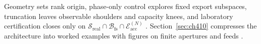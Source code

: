 
Geometry sets rank origin, phase-only control explores fixed export subspaces, truncation leaves observable shoulders and capacity knees, and laboratory
certification closes only on \(\mathcal{S}_{\mathrm{real}}\cap\mathcal{B}_{\mathrm{fs}}\cap\mathcal{E}_{\mathrm{acc}}^{(N)}\) \cite{stratton1941,harrington2001,hansen1988,jackson1999,devaney2004}.
Section~\ref{sec:ch410} compresses the architecture into worked examples with figures on finite apertures and feeds \cite{devaney2004,collin2001}.
